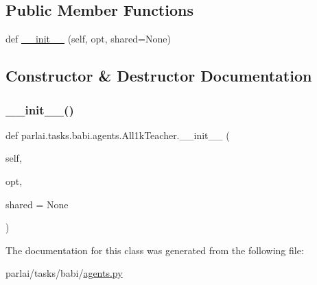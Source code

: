 \subsection*{Public Member Functions}
\begin{DoxyCompactItemize}
\item 
def \hyperlink{classparlai_1_1tasks_1_1babi_1_1agents_1_1All1kTeacher_ac78e7e860aad7926474025863ea9be4e}{\+\_\+\+\_\+init\+\_\+\+\_\+} (self, opt, shared=None)
\end{DoxyCompactItemize}


\subsection{Constructor \& Destructor Documentation}
\mbox{\label{classparlai_1_1tasks_1_1babi_1_1agents_1_1All1kTeacher_ac78e7e860aad7926474025863ea9be4e}} 
\subsubsection{\texorpdfstring{\+\_\+\+\_\+init\+\_\+\+\_\+()}{\_\_init\_\_()}}
{\footnotesize\ttfamily def parlai.\+tasks.\+babi.\+agents.\+All1k\+Teacher.\+\_\+\+\_\+init\+\_\+\+\_\+ (\begin{DoxyParamCaption}\item[{}]{self,  }\item[{}]{opt,  }\item[{}]{shared = {\ttfamily None} }\end{DoxyParamCaption})}



The documentation for this class was generated from the following file\+:\begin{DoxyCompactItemize}
\item 
parlai/tasks/babi/\hyperlink{parlai_2tasks_2babi_2agents_8py}{agents.\+py}\end{DoxyCompactItemize}
